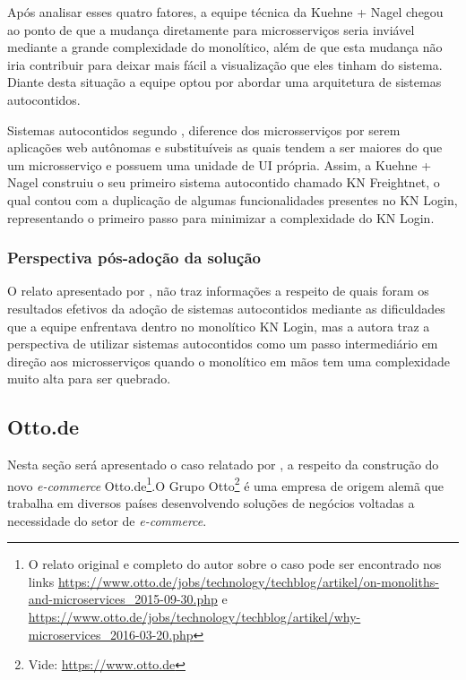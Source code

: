 Após analisar esses quatro fatores, a equipe técnica da Kuehne + Nagel chegou ao ponto de que a
mudança diretamente para microsserviços seria inviável mediante a grande complexidade do monolítico,
além de que esta mudança não iria contribuir para deixar mais fácil a visualização que eles
tinham do sistema. Diante desta situação a equipe optou por abordar uma arquitetura de sistemas
autocontidos.

Sistemas autocontidos segundo , diference dos
microsserviços por serem aplicações web autônomas e substituíveis as quais tendem a ser maiores do
que um microsserviço e possuem uma unidade de \gls{UI} própria. Assim, a Kuehne + Nagel construiu o
seu primeiro sistema autocontido chamado KN Freightnet, o qual contou com a duplicação de algumas
funcionalidades presentes no KN Login, representando o primeiro passo para minimizar a complexidade
do KN Login.

\subsubsection{Perspectiva pós-adoção da solução}

O relato apresentado por , não traz informações a respeito
de quais foram os resultados efetivos da adoção de sistemas autocontidos mediante as dificuldades
que a equipe enfrentava dentro no monolítico KN Login, mas a autora traz a perspectiva de utilizar
sistemas autocontidos como um passo intermediário em direção aos microsserviços quando o monolítico
em mãos tem uma complexidade muito alta para ser quebrado.

\subsection{Otto.de}

Nesta seção será apresentado o caso relatado por  , a
respeito da construção do novo \textit{e-commerce} Otto.de\footnote{O relato original e completo do autor
sobre o caso pode ser encontrado nos links
\url{https://www.otto.de/jobs/technology/techblog/artikel/on-monoliths-and-microservices_2015-09-30.php}
e \url{https://www.otto.de/jobs/technology/techblog/artikel/why-microservices_2016-03-20.php}}.O Grupo
Otto\footnote{Vide: \url{https://www.otto.de}} é uma empresa de origem alemã que trabalha em diversos países
desenvolvendo soluções de negócios voltadas a necessidade do setor de \textit{e-commerce}.

